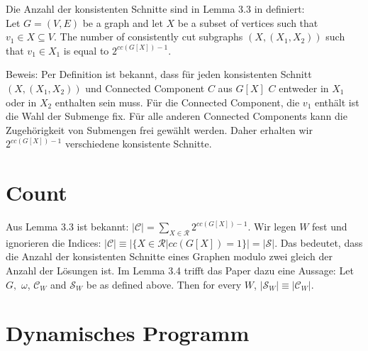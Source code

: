 Die Anzahl der konsistenten Schnitte sind in Lemma 3.3 in \cite{cygan_solving_2011} definiert:\\
Let $G=(V,E)$ be a graph and let $X$ be a subset of vertices such that $v_1 \in X \subseteq V$. The number of consistently cut subgraphs $(X,(X_1,X_2))$ such that $v_1 \in X_1$ is equal to $2^{cc(G[X])-1}$.

Beweis: Per Definition ist bekannt, dass für jeden konsistenten Schnitt $(X,(X_1,X_2))$ und Connected Component $C$ aus $G[X]$ $C$ entweder in $X_1$ oder in $X_2$ enthalten sein muss. Für die Connected Component, die $v_1$ enthält ist die Wahl der Submenge fix. Für alle anderen Connected Components kann die Zugehörigkeit von Submengen frei gewählt werden. Daher erhalten wir $2^{cc(G[X])-1}$ verschiedene konsistente Schnitte.

\section{Count}
\label{sec:st_count}
Aus Lemma 3.3 ist bekannt: $|\mathcal{C}|=\sum_{X \in \mathcal{R}} 2^{cc(G[X])-1}$. Wir legen $W$ fest und ignorieren die Indices: $|\mathcal{C}| \equiv |\{X \in \mathcal{R} |cc(G[X]) = 1\}| = |\mathcal{S}|$. Das bedeutet, dass die Anzahl der konsistenten Schnitte eines Graphen modulo zwei gleich der Anzahl der Lösungen ist. Im Lemma 3.4 trifft das Paper dazu eine Aussage: Let $G,$ $\omega$, $\mathcal{C}_W$ and $\mathcal{S}_W$ be as defined above. Then for every $W$, $|\mathcal{S}_W| \equiv |\mathcal{C}_W|$.

\section{Dynamisches Programm}
\label{sec:dynP}

